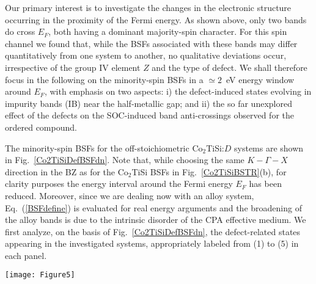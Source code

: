 \documentclass[aps,prb,twocolumn,superscriptaddress,showpacs]{revtex4}
\newcommand{\FG}[1]{Fig.~\ref{#1}}
\newcommand{\EQ}[1]{Eq.~(\ref{#1})}
\begin{document}
Our primary interest is to investigate the changes in the
electronic structure occurring in the proximity of the
Fermi energy. As shown above, only two
bands do cross $E_F$, both having a dominant 
majority-spin character. For this spin channel
we found that, while the BSFs associated with these 
bands may differ quantitatively from one system to another,
no qualitative deviations occur, 
irrespective of the group IV element $Z$ and the
type of defect. 
We shall therefore focus in the following on the minority-spin 
BSFs in a $\simeq 2$~eV energy window around $E_F$,
with emphasis on two aspects: i) the defect-induced states
evolving in impurity bands (IB) near the half-metallic gap;
and ii) the so far unexplored effect of the defects
on the SOC-induced band anti-crossings observed for the ordered
compound. 

The minority-spin BSFs for the off-stoichiometric Co$_2$TiSi:$D$
systems are shown in \FG{Co2TiSiDefBSFdn}. Note that, while
choosing the same $K-\Gamma-X$ direction in the BZ as for the 
Co$_2$TiSi BSFs in \FG{Co2TiSiBSTR}(b), for clarity purposes
the energy interval around the Fermi energy $E_F$
has been reduced. Moreover, since we are dealing now with an
alloy system, \EQ{BSFdefine} is evaluated for real energy
arguments and the broadening of the alloy bands 
is due to the intrinsic disorder of the CPA effective medium. 
We first analyze, on the basis of \FG{Co2TiSiDefBSFdn},
the defect-related states appearing in the investigated systems,
appropriately labeled from (1) to (5) in each panel.

\begin{figure*}
  \centering
  \texttt{[image: Figure5]}
    \caption{(Color online) Minority-spin BSFs along the
    $K-\Gamma-X$ direction in the fcc BZ, calculated for
    several off-stoichiometric 
    native defects in Co$_2$TiSi modeled as dilute alloys
    with $3$~at.\% defect composition. 
    The energy scale is given relative to the 
    Fermi energy of each system.}
  \label{Co2TiSiDefBSFdn}
\end{figure*}
\end{document}

